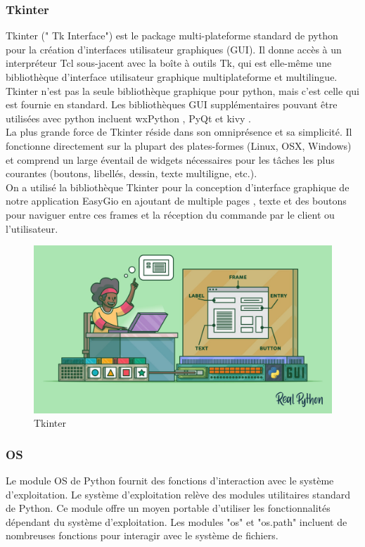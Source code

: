 \documentclass[a4paper]{report}
\begin{document}
\subsubsection{Tkinter}
Tkinter (" Tk Interface") est le package multi-plateforme standard de python pour la création d'interfaces utilisateur graphiques (GUI). Il donne accès à un interpréteur Tcl sous-jacent avec la boîte à outils Tk, qui est elle-même une bibliothèque d'interface utilisateur graphique multiplateforme et multilingue.
Tkinter n'est pas la seule bibliothèque graphique pour python, mais c'est celle qui est fournie en standard. Les bibliothèques GUI supplémentaires pouvant être utilisées avec python incluent wxPython , PyQt et kivy .\\
La plus grande force de Tkinter réside dans son omniprésence et sa simplicité. Il fonctionne directement sur la plupart des plates-formes (Linux, OSX, Windows) et comprend un large éventail de widgets nécessaires pour les tâches les plus courantes (boutons, libellés, dessin, texte
multiligne, etc.).\\
On a utilisé la bibliothèque Tkinter pour la conception d'interface graphique de notre application EasyGio  en ajoutant de multiple pages , texte et des boutons pour naviguer entre ces frames et la réception du commande par le client ou l'utilisateur. 
\begin{figure}[!h]
    \centering
    \includegraphics[width=13cm]{images/Tkinter.png}
    \caption{Tkinter}
    \label{Tkinter}
\end{figure}
\subsubsection{OS}
Le module OS de Python fournit des fonctions d'interaction avec le système d'exploitation. Le système d'exploitation relève des modules utilitaires standard de Python. Ce module offre un moyen portable d'utiliser les fonctionnalités dépendant du système d'exploitation. Les modules "os" et "os.path" incluent de nombreuses fonctions pour interagir avec le système de fichiers.
\end{document}
